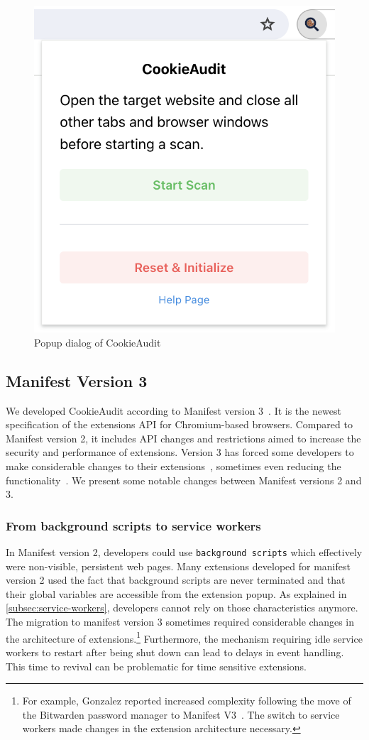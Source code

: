 \begin{figure}
	\centering
	\includegraphics[width=0.5\linewidth]{screenshot_popup.png}
	\caption{Popup dialog of CookieAudit}
	\label{fig:screenshot-popup}
\end{figure}

\subsection{Manifest Version 3} \label{subsec:manifest-v3}
We developed CookieAudit according to Manifest version 3~\cite{manifestv3}.
It is the newest specification of the extensions API for Chromium-based browsers.
Compared to Manifest version 2, it includes API changes and restrictions aimed to increase the security and performance of extensions.
Version 3 has forced some developers to make considerable changes to their extensions~\cite{purdy2024chrome, huczynski2018ublock}, sometimes even reducing the functionality~\cite{hill2024google}.
We present some notable changes between Manifest versions 2 and 3.

\subsubsection{From background scripts to service workers}
In Manifest version 2, developers could use \texttt{background scripts} which effectively were non-visible, persistent web pages.
Many extensions developed for manifest version 2 used the fact that background scripts are never terminated and that their global variables are accessible from the extension popup.
As explained in \cref{subsec:service-workers}, developers cannot rely on those characteristics anymore.
The migration to manifest version 3 sometimes required considerable changes in the architecture of extensions.\footnote{
For example, Gonzalez reported increased complexity following the move of the Bitwarden password manager to Manifest V3~\cite{gonzalez2024bitwarden}.
The switch to service workers made changes in the extension architecture necessary.}
Furthermore, the mechanism requiring idle service workers to restart after being shut down can lead to delays in event handling.
This time to revival can be problematic for time sensitive extensions.

